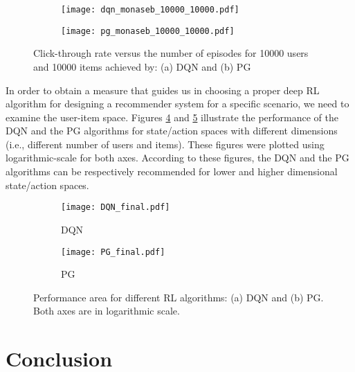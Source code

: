 \documentclass[journal]{IEEEtran}
\begin{document}
%

\begin{figure}[!ht]
\centering
\begin{subfigure}[b]{0.45\textwidth}
\texttt{[image: dqn\_monaseb\_10000\_10000.pdf]}
\caption{}
\label{}
\end{subfigure}
\quad
\begin{subfigure}[b]{0.45\textwidth}
\texttt{[image: pg\_monaseb\_10000\_10000.pdf]}
\caption{}
\label{huber_eval}
\end{subfigure}

\caption{Click-through rate versus the number of  episodes for 10000 users and 10000 items achieved by:  (a) DQN and (b) PG}\label{dqn_pg_3}
\end{figure}

In order to obtain a measure that guides us in choosing a proper deep RL algorithm for designing a recommender system for a specific scenario, we need to examine the user-item space. Figures \ref{dqn_area} and \ref{pg_area} illustrate the performance of the DQN and the PG algorithms for state/action spaces with different dimensions (i.e., different number of users and items). These figures were plotted using logarithmic-scale for both axes. According to these figures, the DQN and the PG algorithms can be respectively recommended for lower and higher dimensional state/action spaces.


\begin{figure}[!ht]
\centering
\begin{subfigure}[b]{0.45\textwidth}
\texttt{[image: DQN\_final.pdf]}
\caption{DQN}
\label{dqn_area}
\end{subfigure}
\quad
\begin{subfigure}[b]{0.45\textwidth}
\texttt{[image: PG\_final.pdf]}
\caption{PG}
\label{pg_area}
\end{subfigure}
\caption{Performance area for different RL algorithms: (a) DQN and (b) PG. Both axes are in logarithmic scale.}\label{}
\end{figure}


\section{Conclusion}
\end{document}
